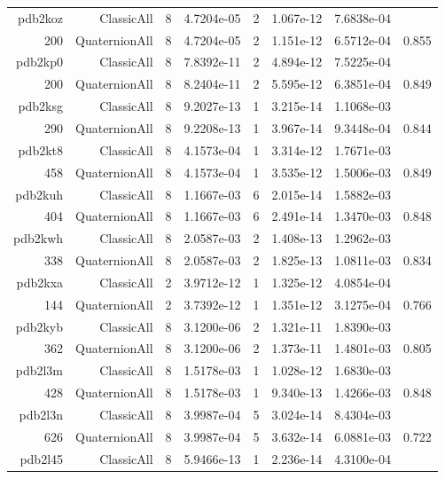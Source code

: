 \begin{xltabular}{\textwidth}{r|rcS[table-format=1.4e+2]cS[table-format=1.3e+2]S[table-format=1.4e+2]S[table-format=-1.3]}
pdb2koz & ClassicAll & 8 & 4.7204e-05 & 2 & 1.067e-12 & 7.6838e-04 & \\
200 & QuaternionAll & 8 & 4.7204e-05 & 2 & 1.151e-12 & 6.5712e-04 & 0.855\\  \addlinespace
pdb2kp0 & ClassicAll & 8 & 7.8392e-11 & 2 & 4.894e-12 & 7.5225e-04 & \\
200 & QuaternionAll & 8 & 8.2404e-11 & 2 & 5.595e-12 & 6.3851e-04 & 0.849\\  \addlinespace
pdb2ksg & ClassicAll & 8 & 9.2027e-13 & 1 & 3.215e-14 & 1.1068e-03 & \\
290 & QuaternionAll & 8 & 9.2208e-13 & 1 & 3.967e-14 & 9.3448e-04 & 0.844\\  \addlinespace
pdb2kt8 & ClassicAll & 8 & 4.1573e-04 & 1 & 3.314e-12 & 1.7671e-03 & \\
458 & QuaternionAll & 8 & 4.1573e-04 & 1 & 3.535e-12 & 1.5006e-03 & 0.849\\  \addlinespace
pdb2kuh & ClassicAll & 8 & 1.1667e-03 & 6 & 2.015e-14 & 1.5882e-03 & \\
404 & QuaternionAll & 8 & 1.1667e-03 & 6 & 2.491e-14 & 1.3470e-03 & 0.848\\  \addlinespace
pdb2kwh & ClassicAll & 8 & 2.0587e-03 & 2 & 1.408e-13 & 1.2962e-03 & \\
338 & QuaternionAll & 8 & 2.0587e-03 & 2 & 1.825e-13 & 1.0811e-03 & 0.834\\  \addlinespace
pdb2kxa & ClassicAll & 2 & 3.9712e-12 & 1 & 1.325e-12 & 4.0854e-04 & \\
144 & QuaternionAll & 2 & 3.7392e-12 & 1 & 1.351e-12 & 3.1275e-04 & 0.766\\  \addlinespace
pdb2kyb & ClassicAll & 8 & 3.1200e-06 & 2 & 1.321e-11 & 1.8390e-03 & \\
362 & QuaternionAll & 8 & 3.1200e-06 & 2 & 1.373e-11 & 1.4801e-03 & 0.805\\  \addlinespace
pdb2l3m & ClassicAll & 8 & 1.5178e-03 & 1 & 1.028e-12 & 1.6830e-03 & \\
428 & QuaternionAll & 8 & 1.5178e-03 & 1 & 9.340e-13 & 1.4266e-03 & 0.848\\  \addlinespace
pdb2l3n & ClassicAll & 8 & 3.9987e-04 & 5 & 3.024e-14 & 8.4304e-03 & \\
626 & QuaternionAll & 8 & 3.9987e-04 & 5 & 3.632e-14 & 6.0881e-03 & 0.722\\  \addlinespace
pdb2l45 & ClassicAll & 8 & 5.9466e-13 & 1 & 2.236e-14 & 4.3100e-04 & \\

\end{xltabular}
